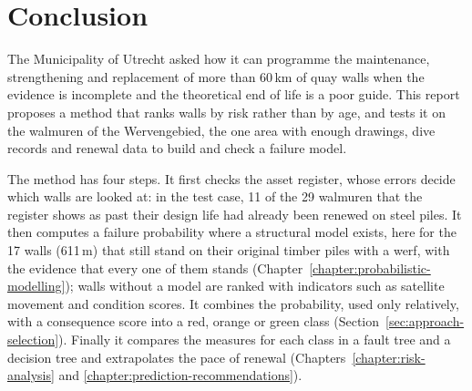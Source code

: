 \chapter{Conclusion}
\label{chapter:conclusion}

The Municipality of Utrecht asked how it can programme the maintenance,
strengthening and replacement of more than 60\,km of quay walls when the
evidence is incomplete and the theoretical end of life is a poor guide. This
report proposes a method that ranks walls by risk rather than by age, and tests
it on the walmuren of the Wervengebied, the one area with enough drawings, dive
records and renewal data to build and check a failure model.

The method has four steps. It first checks the asset register, whose errors
decide which walls are looked at: in the test case, 11 of the 29 walmuren that
the register shows as past their design life had already been renewed on steel
piles. It then computes a failure probability where a structural model exists,
here for the 17 walls (611\,m) that still stand on their original timber piles
with a werf, with the evidence that every one of them stands
(Chapter~\ref{chapter:probabilistic-modelling}); walls without a model are
ranked with indicators such as satellite movement and condition scores. It
combines the probability, used only relatively, with a consequence score into
a red, orange or green class (Section~\ref{sec:approach-selection}). Finally it
compares the measures for each class in a fault tree and a decision tree and
extrapolates the pace of renewal (Chapters~\ref{chapter:risk-analysis} and
\ref{chapter:prediction-recommendations}).

